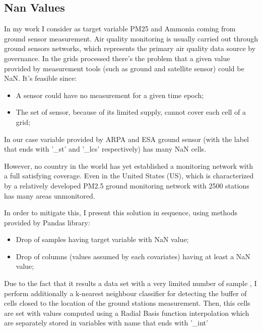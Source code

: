 \subsection{Nan Values}
\label{subsec:nan}
In my work I consider as target variable PM25 and Ammonia coming from ground sensor measurement.
Air quality monitoring is usually carried out through ground sensors networks, which represents the primary air quality data source by governance. \newline
In the grids processed there's the problem that a given value provided by measurement tools (such as ground and satellite sensor) could be NaN. 
It's feasible since:
\begin{itemize}
\item A sensor could have no measurement for a given time epoch;
\item The set of sensor, because of its limited supply, cannot cover each cell of a grid;
\end{itemize}
In our case variable provided by ARPA and ESA ground sensor (with the label that ends with '\_st' and '\_lcs' respectively) has many NaN cells.
\par
However, no country in the world has yet established a monitoring network with a full satisfying coverage\cite{liu2018improve}. Even in the United States (US), which is characterized by a relatively developed PM2.5 ground monitoring network with 2500 stations has many areas unmonitored\cite{liu2018improve}. \par
In order to mitigate this, I present this solution in sequence, using methods provided by Pandas library:
\begin{itemize}
\item Drop of samples having target variable with NaN value;
\item Drop of columns (values assumed by each covariates) having at least a NaN value;
\end{itemize}
\pagebreak
Due to the fact that it results a data set with a very limited number of sample \cite{zhang2018strategy}, I perform additionally a k-nearest neighbour classifier\cite{taunk2019brief} for detecting the buffer of cells closed to the location of the ground stations measurement. Then, this cells are set with values computed using a Radial Basis function interpolation\cite{wright2003radial} which are separately stored in variables with name that ends with '\_int'\newline

